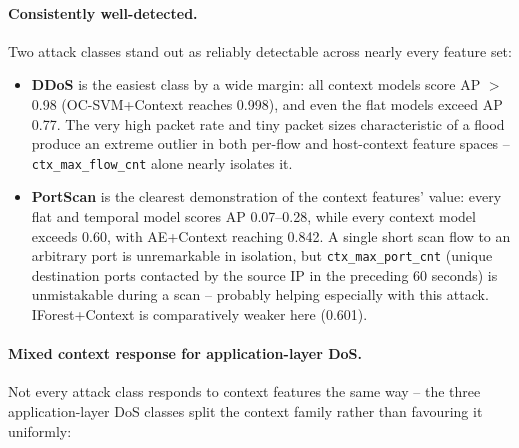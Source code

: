 \paragraph{Consistently well-detected.} Two attack classes stand out as reliably detectable across nearly every feature set:

\begin{itemize}
  \item \textbf{DDoS} is the easiest class by a wide margin: all context models score AP $>$ 0.98 (OC-SVM+Context reaches 0.998), and even the flat models exceed AP 0.77. The very high packet rate and tiny packet sizes characteristic of a flood produce an extreme outlier in both per-flow and host-context feature spaces -- \texttt{ctx\_max\_flow\_cnt} alone nearly isolates it.
  \item \textbf{PortScan} is the clearest demonstration of the context features' value: every flat and temporal model scores AP 0.07--0.28, while every context model exceeds 0.60, with AE+Context reaching 0.842. A single short scan flow to an arbitrary port is unremarkable in isolation, but \texttt{ctx\_max\_port\_cnt} (unique destination ports contacted by the source IP in the preceding 60 seconds) is unmistakable during a scan -- probably helping especially with this attack. IForest+Context is comparatively weaker here (0.601).
\end{itemize}

\paragraph{Mixed context response for application-layer DoS.} Not every attack class responds to context features the same way -- the three application-layer DoS classes split the context family rather than favouring it uniformly:

